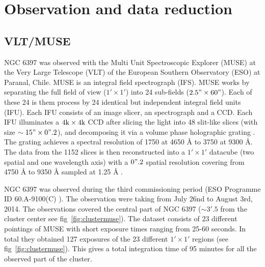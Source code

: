 \chapter{Observation and data reduction}\label{chap:data}
\thispagestyle{fancy}

\section{VLT/MUSE}

NGC 6397 was observed with the Multi Unit Spectroscopic Explorer (MUSE) at the Very Large Telescope (VLT) of the European Southern Observatory (ESO) at Paranal, Chile. MUSE is an integral field spectrograph (IFS). MUSE works by separating the full field of view ($1' \times 1'$) into 24 sub-fields ($2.5" \times 60"$). Each of these 24 is them process by 24 identical but independent integral field units (IFU). Each IFU consists of an image slicer, an spectrograph and a CCD. Each IFU illuminates a $4 \text k \times 4 \text k$ CCD after slicing the light into 48 slit-like slices (with size $\sim 15" \times 0".2$), and decomposing it via a volume phase holographic grating \citep{barden_volume-phase_1998}. The grating achieves a spectral resolution of 1750 at 4650 Å to 3750 at 9300 Å. The data from the 1152 slices is then reconstructed into a $1' \times 1'$ datacube (two spatial and one wavelength axis) with a $0".2$ spatial resolution covering from 4750 Å to 9350 Å sampled at 1.25 Å \citep{bacon_muse_2010}. 

NGC 6397 was observed during the third commissioning period  (ESO Programme ID 60.A-9100(C) \cite{bacon_muse_2014}). The observation were taking from July 26nd to August 3rd, 2014. The observations covered the central part of NGC 6397 ($\sim 3'.5$ from the cluster center see fig~\ref{fig:clustermuse}). The dataset consists of 23 different pointings of MUSE with short exposure times ranging from 25-60 seconds. In total they obtained 127 exposures of the 23 different $1' \times 1'$ regions (see fig~\ref{fig:clustermuse}). This gives a total integration time of 95 minutes for all the observed part of the cluster.


